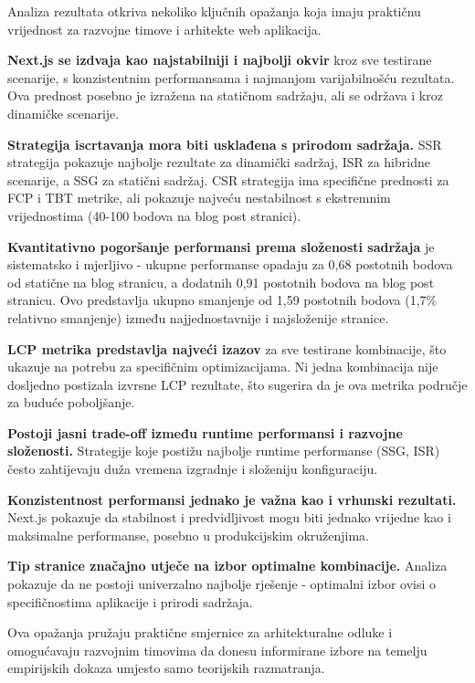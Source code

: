 Analiza rezultata otkriva nekoliko ključnih opažanja koja imaju praktičnu vrijednost za razvojne timove i arhitekte web aplikacija.

\textbf{Next.js se izdvaja kao najstabilniji i najbolji okvir} kroz sve testirane scenarije, s konzistentnim performansama i najmanjom varijabilnošću rezultata. Ova prednost posebno je izražena na statičnom sadržaju, ali se održava i kroz dinamičke scenarije.

\textbf{Strategija iscrtavanja mora biti usklađena s prirodom sadržaja.} SSR strategija pokazuje najbolje rezultate za dinamički sadržaj, ISR za hibridne scenarije, a SSG za statični sadržaj. CSR strategija ima specifične prednosti za FCP i TBT metrike, ali pokazuje najveću nestabilnost s ekstremnim vrijednostima (40-100 bodova na blog post stranici).

\textbf{Kvantitativno pogoršanje performansi prema složenosti sadržaja} je sistematsko i mjerljivo - ukupne performanse opadaju za 0,68 postotnih bodova od statične na blog stranicu, a dodatnih 0,91 postotnih bodova na blog post stranicu. Ovo predstavlja ukupno smanjenje od 1,59 postotnih bodova (1,7\% relativno smanjenje) između najjednostavnije i najsloženije stranice.

\textbf{LCP metrika predstavlja najveći izazov} za sve testirane kombinacije, što ukazuje na potrebu za specifičnim optimizacijama. Ni jedna kombinacija nije dosljedno postizala izvrsne LCP rezultate, što sugerira da je ova metrika područje za buduće poboljšanje.

\textbf{Postoji jasni trade-off između runtime performansi i razvojne složenosti.} Strategije koje postižu najbolje runtime performanse (SSG, ISR) često zahtijevaju duža vremena izgradnje i složeniju konfiguraciju.

\textbf{Konzistentnost performansi jednako je važna kao i vrhunski rezultati.} Next.js pokazuje da stabilnost i predvidljivost mogu biti jednako vrijedne kao i maksimalne performanse, posebno u produkcijskim okruženjima.

\textbf{Tip stranice značajno utječe na izbor optimalne kombinacije.} Analiza pokazuje da ne postoji univerzalno najbolje rješenje - optimalni izbor ovisi o specifičnostima aplikacije i prirodi sadržaja.

Ova opažanja pružaju praktične smjernice za arhitekturalne odluke i omogućavaju razvojnim timovima da donesu informirane izbore na temelju empirijskih dokaza umjesto samo teorijskih razmatranja.
